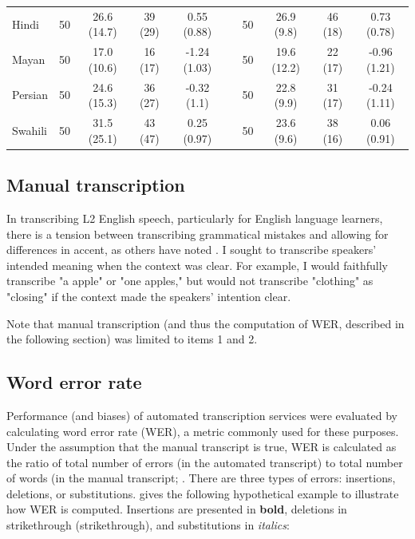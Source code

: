 \documentclass [PhD] {uclathes}
\newlength{\wdth}
\newcommand{\strike}[1]{\settowidth{\wdth}{#1}\rlap{\rule[.5ex]{\wdth}{.4pt}}#1}
\begin{document}
\begin{table}[htbp]
\begin{tabular}{lccccccccc}
\hspace{3mm} Hindi & 50 & 26.6 (14.7) & 39 (29) & 0.55 (0.88) & & 50 & 26.9 (9.8) & 46 (18) & 0.73 (0.78) \\
\hspace{3mm} Mayan & 50 & 17.0 (10.6) & 16 (17) & -1.24 (1.03) & & 50 & 19.6 (12.2) & 22 (17) & -0.96 (1.21) \\
\hspace{3mm} Persian & 50 & 24.6 (15.3) & 36 (27) & -0.32 (1.1) & & 50 & 22.8 (9.9) & 31 (17) & -0.24 (1.11) \\
\hspace{3mm} Swahili & 50 & 31.5 (25.1) & 43 (47) & 0.25 (0.97) & & 50 & 23.6 (9.6) & 38 (16) & 0.06 (0.91) \\
    \bottomrule
    \end{tabular}
\end{table}

\subsection{Manual transcription}

In transcribing L2 English speech, particularly for English language learners, there is a tension between transcribing grammatical mistakes and allowing for differences in accent, as others have noted \cite{yoon2019features}. I sought to transcribe speakers' intended meaning when the context was clear. For example, I would faithfully transcribe "a apple" or "one apples," but would not transcribe "clothing" as "closing" if the context made the speakers' intention clear.

Note that manual transcription (and thus the computation of WER, described in the following section) was limited to items 1 and 2. 

\subsection{Word error rate}
\label{methods_wer}

Performance (and biases) of automated transcription services were evaluated by calculating word error rate (WER), a metric commonly used for these purposes. Under the assumption that the manual transcript is true, WER is calculated as the ratio of total number of errors (in the automated transcript) to total number of words (in the manual transcript; \cite{qian2019automatic}. There are three types of errors: insertions, deletions, or substitutions. \citet[][p. 65]{qian2019automatic} gives the following hypothetical example to illustrate how WER is computed. Insertions are presented in \textbf{bold}, deletions in \strike{strikethrough} (strikethrough), and substitutions in \emph{italics}:
\end{document}
